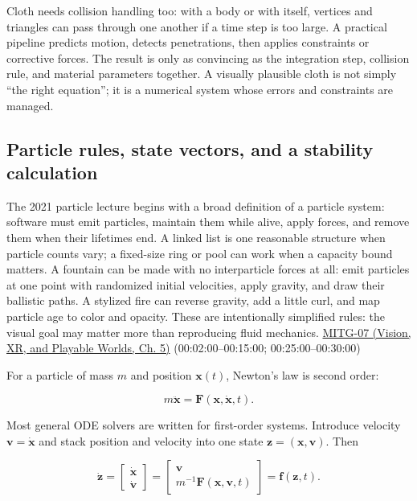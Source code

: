 Cloth needs collision handling too: with a body or with itself, vertices and triangles can pass through one another if a time step is too large. A practical pipeline predicts motion, detects penetrations, then applies constraints or corrective forces. The result is only as convincing as the integration step, collision rule, and material parameters together. A visually plausible cloth is not simply ``the right equation''; it is a numerical system whose errors and constraints are managed.

\subsection{Particle rules, state vectors, and a stability calculation}\label{04-visual-computing-ii-ch029-particle-rules-state-vectors-and-a-stability-calculation}

\hypertarget{04-visual-computing-ii-ch029-particle-rules-state-vectors-and-a-stability-calculation}{}

The 2021 particle lecture begins with a broad definition of a particle system: software must emit particles, maintain them while alive, apply forces, and remove them when their lifetimes end. A linked list is one reasonable structure when particle counts vary; a fixed-size ring or pool can work when a capacity bound matters. A fountain can be made with no interparticle forces at all: emit particles at one point with randomized initial velocities, apply gravity, and draw their ballistic paths. A stylized fire can reverse gravity, add a little curl, and map particle age to color and opacity. These are intentionally simplified rules: the visual goal may matter more than reproducing fluid mechanics. \href{../07-Vision-XR-and-Playable-Worlds/main.pdf\#nameddest=04-visual-computing-ii-ch036-mitg-07---particle-systems}{MITG-07 (Vision, XR, and Playable Worlds, Ch. 5)} (00:02:00--00:15:00; 00:25:00--00:30:00)

For a particle of mass \(m\) and position \(\boldsymbol{x}(t)\), Newton's law is second order:

\[
m\ddot{\boldsymbol{x}}=\boldsymbol{F}(\boldsymbol{x},\dot{\boldsymbol{x}},t).
\]

Most general ODE solvers are written for first-order systems. Introduce velocity \(\boldsymbol{v}=\dot{\boldsymbol{x}}\) and stack position and velocity into one state \(\boldsymbol{z}=(\boldsymbol{x},\boldsymbol{v})\). Then

\[
\dot{\boldsymbol{z}}=
\begin{bmatrix}\dot{\boldsymbol{x}}\\\dot{\boldsymbol{v}}\end{bmatrix}
=\begin{bmatrix}\boldsymbol{v}\\m^{-1}\boldsymbol{F}(\boldsymbol{x},\boldsymbol{v},t)\end{bmatrix}
=\boldsymbol{f}(\boldsymbol{z},t).
\]

